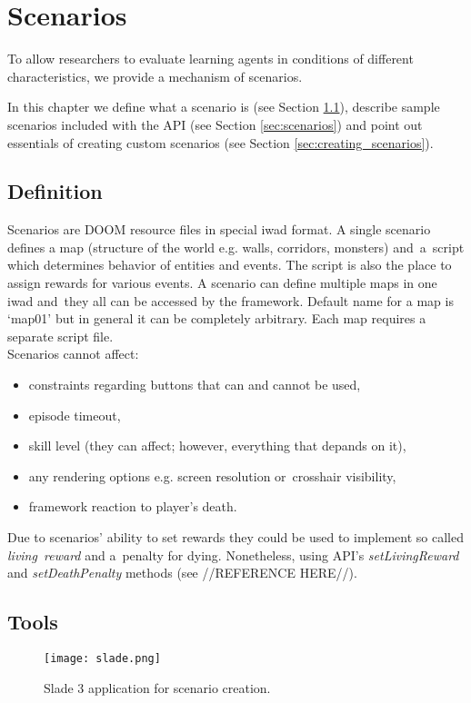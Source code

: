 
\chapter{Scenarios}

To allow researchers to evaluate learning agents in conditions of different characteristics, we provide a mechanism of scenarios.

In this chapter we define what a scenario is (see Section \ref{sec:scenario_definition}), describe sample scenarios included with the API (see Section \ref{sec:scenarios}) and point out essentials of creating custom scenarios (see Section \ref{sec:creating_scenarios}).

\section{Definition}\label{sec:scenario_definition}
Scenarios are DOOM resource files in special iwad format. A single scenario defines a map (structure of the world e.g. walls, corridors, monsters) and~a~script which determines behavior of entities and events. The script is also the place to assign rewards for various events. A scenario can define multiple maps in one iwad and~they all can be accessed by the framework. Default name for a map is `map01' but in general it can be completely arbitrary. Each map requires a separate script file.
\\
Scenarios cannot affect:
\begin{itemize}
	\item constraints regarding buttons that can and cannot be used,
	\item episode timeout,
	\item skill level (they can affect; however, everything that depands on it),
	\item any rendering options e.g. screen resolution or~crosshair visibility,
	\item framework reaction to player's death.
\end{itemize}

Due to scenarios' ability to set rewards they could be used to implement so called \emph{living~reward} and a~penalty for dying. Nonetheless, using API's \emph{setLivingReward} and \emph{setDeathPenalty} methods (see //REFERENCE HERE//).

\section{Tools}\label{sec:tools}
\begin{figure}
		\centering
		\texttt{[image: slade.png]}
		\caption{Slade 3 application for scenario creation.}\label{fig:slade}
	\end{figure}

